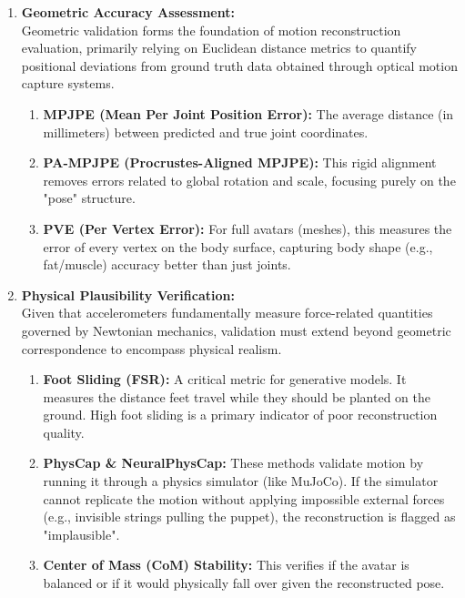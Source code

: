 \documentclass[12pt, a4paper, oneside]{report}
\begin{document}
\newpage

\begin{enumerate}[leftmargin=*, itemsep=1em, label=\roman*.]

  \item \textbf{Geometric Accuracy Assessment:} \\
    Geometric validation forms the foundation of motion reconstruction evaluation, primarily relying on Euclidean distance metrics to quantify positional deviations from ground truth data obtained through optical motion capture systems\cite{zhao2025ppmotion}.
    \begin{enumerate}[leftmargin=*]
        \item \textbf{MPJPE (Mean Per Joint Position Error):} The average distance (in millimeters) between predicted and true joint coordinates.
        \item \textbf{PA-MPJPE (Procrustes-Aligned MPJPE):} This rigid alignment removes errors related to global rotation and scale, focusing purely on the "pose" structure.
        \item \textbf{PVE (Per Vertex Error):} For full avatars (meshes), this measures the error of every vertex on the body surface, capturing body shape (e.g., fat/muscle) accuracy better than just joints.
  \end{enumerate}

  \item \textbf{Physical Plausibility Verification:} \\
    Given that accelerometers fundamentally measure force-related quantities governed by Newtonian mechanics, validation must extend beyond geometric correspondence to encompass physical realism\cite{zhu2025human}.
    \begin{enumerate}[leftmargin=*]
        \item \textbf{Foot Sliding (FSR):} A critical metric for generative models. It measures the distance feet travel while they should be planted on the ground. High foot sliding is a primary indicator of poor reconstruction quality.
        \item \textbf{PhysCap \& NeuralPhysCap:} These methods validate motion by running it through a physics simulator (like MuJoCo). If the simulator cannot replicate the motion without applying impossible external forces (e.g., invisible strings pulling the puppet), the reconstruction is flagged as "implausible".
        \item \textbf{Center of Mass (CoM) Stability:} This verifies if the avatar is balanced or if it would physically fall over given the reconstructed pose.
  \end{enumerate}


\end{enumerate}
\end{document}
